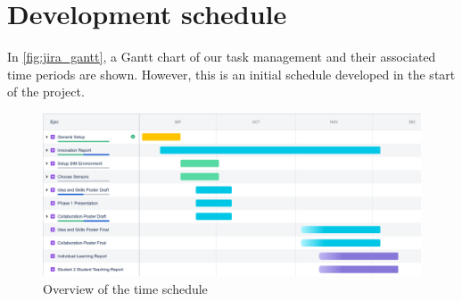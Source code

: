 \documentclass[../Head/Main.tex]{subfiles}
\begin{document}
\section{Development schedule}
In \autoref{fig:jira_gantt}, a Gantt chart of our task management and their associated time periods are shown. However, this is an initial schedule developed in the start of the project. 

\begin{figure}[H]
    \centering
    \includegraphics[width=\textwidth]{../Figures/fence_inspection_drone.png}
    \caption{Overview of the time schedule}
    \label{fig:jira_gantt}
\end{figure}
\end{document}
